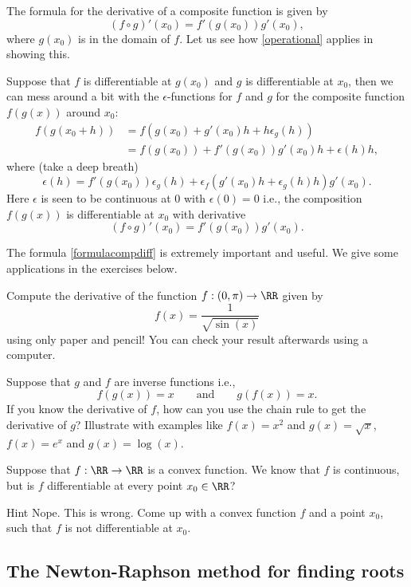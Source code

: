 \documentclass{article}
\begin{document}
The formula for the derivative of a composite function is given by
$$
(f\circ g)'(x_0) = f'(g(x_0)) g'(x_0),
$$
where $g(x_0)$ is in the domain of $f$. Let us see how \eqref{operational}
applies in showing this.

Suppose that $f$ is differentiable at $g(x_0)$ and $g$ is
differentiable at $x_0$, then we can mess around a bit
with the $\epsilon$-functions for $f$ and $g$ for
the composite function $f(g(x))$ around $x_0$:
\begin{align*}
f(g(x_0 + h)) &= f(g(x_0) + g'(x_0) h + h \epsilon_g(h))\\
  &= f(g(x_0)) + f'(g(x_0)) g'(x_0) h + \epsilon(h) h,
\end{align*}
where (take a deep breath)
$$
\epsilon(h) = f'(g(x_0)) \epsilon_g(h) + \epsilon_f(g'(x_0) h + \epsilon_g(h)h) g'(x_0).
$$
Here $\epsilon$ is seen to be continuous at $0$ with $\epsilon(0)=0$ i.e.,
the composition $f(g(x))$ is differentiable at $x_0$ with
derivative
\begin{equation}\label{formulacompdiff}
(f\circ g)'(x_0) = f'(g(x_0)) g'(x_0).
\end{equation}

The formula \eqref{formulacompdiff} is extremely important and useful. We give some applications in
the exercises below.

\beginshex
Compute the derivative of the function $f: (0, \pi) \rightarrow \RR$ given by
$$
f(x) = \dfrac{1}{\sqrt{\sin(x)}}
$$
using only paper and pencil! You can check your result afterwards using a computer.
\endshex

\beginshex
Suppose that $g$ and $f$ are inverse functions i.e.,
$$
f(g(x)) = x\qquad \text{and} \qquad g( f(x)) = x.
$$
If you know the derivative of $f$, how can you use the chain rule
to get the derivative of $g$? Illustrate with examples like
$f(x) = x^2$ and $g(x) = \sqrt{x}$, $f(x) = e^x$ and $g(x) = \log(x)$.
\endshex


\beginshex
Suppose that $f:\RR\rightarrow \RR$ is a convex function. We know that
$f$ is continuous, but is $f$ differentiable at every point $x_0\in \RR$?

\begin{hideinbutton}{Hint}
  Nope. This is wrong. Come up with a convex function $f$ and a point $x_0$,
  such that $f$ is not differentiable at $x_0$.
\end{hideinbutton}
\endshex

\subsection{The Newton-Raphson method for finding roots}
\end{document}
